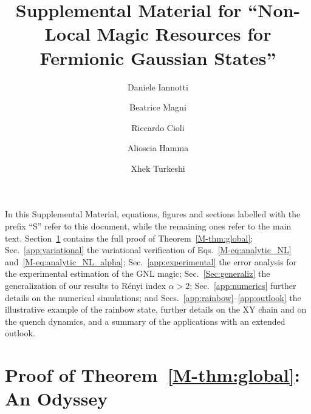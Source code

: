 \documentclass[aps,prl,twocolumn,superscriptaddress,reprint,longbibliography,nofootinbib]{revtex4-2}
\newcommand{\RENYI}{\alpha}
\begin{document}
\title{Supplemental Material for ``Non-Local Magic Resources for Fermionic Gaussian States''}

\author{Daniele Iannotti}
\author{Beatrice Magni}
\author{Riccardo Cioli}
\author{Alioscia Hamma}
\author{Xhek Turkeshi}

\maketitle

\noindent In this Supplemental Material, equations, figures and sections labelled with the prefix ``S'' refer to this document, while the remaining ones refer to the main text. Section~\ref{app:proof} contains the full proof of Theorem~\ref{M-thm:global}; Sec.~\ref{app:variational} the variational verification of Eqs.~\eqref{M-eq:analytic_NL} and~\eqref{M-eq:analytic_NL_alpha}; Sec.~\ref{app:experimental} the error analysis for the experimental estimation of the GNL magic; Sec.~\ref{Sec:generaliz} the generalization of our results to R\'enyi index $\RENYI>2$; Sec.~\ref{app:numerics} further details on the numerical simulations; and Secs.~\ref{app:rainbow}--\ref{app:outlook} the illustrative example of the rainbow state, further details on the XY chain and on the quench dynamics, and a summary of the applications with an extended outlook.

\section{Proof of Theorem~\ref{M-thm:global}: An Odyssey %
}
\label{app:proof}
\end{document}
